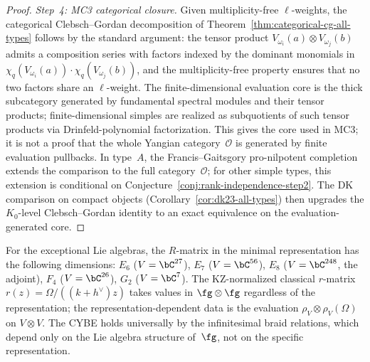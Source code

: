 \begin{proof}
\emph{Step~4: MC3 categorical closure.}
Given multiplicity-free $\ell$-weights, the categorical
Clebsch--Gordan decomposition of
Theorem~\ref{thm:categorical-cg-all-types} follows by the standard
argument: the tensor product $V_{\omega_i}(a) \otimes V_{\omega_j}(b)$
admits a composition series with factors indexed by the dominant
monomials in $\chi_q(V_{\omega_i}(a)) \cdot \chi_q(V_{\omega_j}(b))$,
and the multiplicity-free property ensures that no two factors share
an $\ell$-weight. The finite-dimensional evaluation core is the thick
subcategory generated by fundamental spectral modules and their tensor
products; finite-dimensional simples are realized as subquotients of
such tensor products via Drinfeld-polynomial factorization. This gives
the core used in MC3; it is not a proof that the whole
Yangian category~$\mathcal O$ is generated by finite evaluation
pullbacks. In type~$A$, the Francis--Gaitsgory pro-nilpotent
completion~\cite{FG12} extends the comparison to the full
category~$\mathcal{O}$; for other simple types, this extension
is conditional on Conjecture~\ref{conj:rank-independence-step2}.
The DK comparison on compact objects (Corollary~\ref{cor:dk23-all-types})
then upgrades the $K_0$-level Clebsch--Gordan identity to an exact
equivalence on the evaluation-generated core.
\end{proof}

\begin{remark}
\label{rem:exceptional-rmatrix}
For the exceptional Lie algebras, the $R$-matrix in the minimal
representation has the following dimensions:
$E_6$ ($V = \bC^{27}$), $E_7$ ($V = \bC^{56}$),
$E_8$ ($V = \bC^{248}$, the adjoint), $F_4$ ($V = \bC^{26}$),
$G_2$ ($V = \bC^{7}$). The KZ-normalized classical $r$-matrix
$r(z)=\Omega/((k+h^\vee)z)$ takes values in $\fg \otimes \fg$
regardless of the representation; the
representation-dependent data is the evaluation
$\rho_V \otimes \rho_V(\Omega)$ on $V \otimes V$.
The CYBE holds universally by the infinitesimal braid relations,
which depend only on the Lie algebra structure of~$\fg$, not on
the specific representation.
\end{remark}

